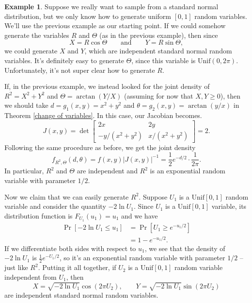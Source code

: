 \documentclass[12pt]{article}
\theoremstyle{plain}
\theoremstyle{definition}
\newtheorem{example}[theorem]{Example}
\theoremstyle{remark}
\newcommand{\Unif}{\ensuremath{\textrm{Unif}}}
\begin{document}
\begin{example}
    Suppose we really want to sample from a standard normal distribution, but we only know how to generate uniform $[0,1]$ random variables.
    We'll use the previous example as our starting point.
    If we could somehow generate the variables $R$ and $\Theta$ (as in the previous example), then since
    \[
        X = R\cos \Theta\qquad\text{and}\qquad Y = R\sin \Theta,
    \]
    we could generate $X$ and $Y$, which are independent standard normal random variables.
    It's definitely easy to generate $\Theta$, since this variable is $\Unif (0, 2\pi)$.
    Unfortunately, it's not super clear how to generate $R$.

    If, in the previous example, we instead looked for the joint density of $R^2 = X^2+Y^2$ and $\Theta = \arctan (Y/X)$ (assuming for now that $X, Y\geq 0$), then we should take $d = g_1(x, y) = x^2+y^2$ and $\theta = g_2(x,y) = \arctan (y/x)$ in Theorem \ref{change of variables}.
    In this case, our Jacobian becomes.
    \[
        J(x,y) = \det \begin{bmatrix}
            2x & 2y\\
            -y/(x^2+y^2) & x/(x^2+y^2)
        \end{bmatrix} = 2.
    \]
    Following the same procedure as before, we get the joint density
    \[
        f_{R^2, \Theta}(d, \theta) = f(x,y)|J(x,y)|^{-1} = \frac{1}{2}e^{-d/2}\cdot \frac{1}{2\pi}.
    \]
    In particular, $R^2$ and $\Theta$ are independent and $R^2$ is an exponential random variable with parameter $1/2$.

    Now we claim that we can easily generate $R^2$.
    Suppose $U_1$ is a $\Unif [0,1]$ random variable and consider the quantity $-2\ln U_1$.
    Since $U_1$ is a $\Unif [0,1]$ variable, its distribution function is $F_{U_1}(u_1) = u_1$ and we have
    \begin{align*}
        \Pr[-2\ln U_1 \leq u_1] &= \Pr[U_1 \geq e^{-u_1/2}]\\
        &= 1-e^{-u_1/2}.
    \end{align*}
    If we differentiate both sides with respect to $u_1$, we see that the density of $-2 \ln U_1$ is $\frac{1}{2}e^{-U_1/2}$, so it's an exponential random variable with parameter $1/2$ -- just like $R^2$.
    Putting it all together, if $U_2$ is a $\Unif [0,1]$ random variable independent from $U_1$, then
    \[
        X = \sqrt{-2 \ln U_1} \cos (2\pi U_2),\qquad Y = \sqrt{-2 \ln U_1}\sin(2\pi U_2)
    \]
    are independent standard normal random variables.
\end{example}
\end{document}
